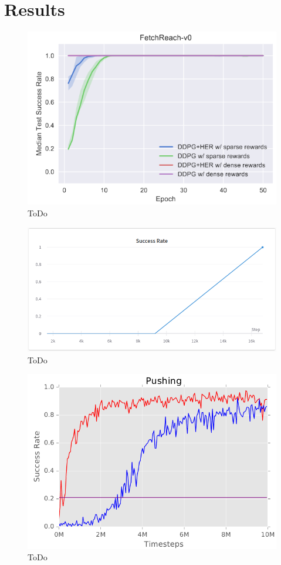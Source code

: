 \section{Results}

\begin{figure}[h!]
    \centering
    \includegraphics[width=\textwidth]{images/FRB.png}
    \caption{ToDo}
    \label{fig:HER}
\end{figure}

\begin{figure}[h!]
    \centering
    \includegraphics[width=\textwidth]{images/FRSR.png}
    \caption{ToDo}
    \label{fig:HER}
\end{figure}

\begin{figure}[h!]
    \centering
    \includegraphics[width=\textwidth]{images/FPB.png}
    \caption{ToDo}
    \label{fig:HER}
\end{figure}

